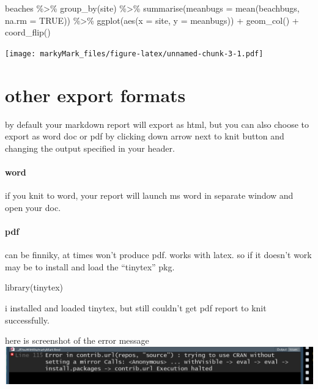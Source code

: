 \documentclass[
]{article}
\newenvironment{Shaded}{\begin{snugshade}}{\end{snugshade}}
\newcommand{\AttributeTok}[1]{\textcolor[rgb]{0.77,0.63,0.00}{#1}}
\newcommand{\ConstantTok}[1]{\textcolor[rgb]{0.00,0.00,0.00}{#1}}
\newcommand{\FunctionTok}[1]{\textcolor[rgb]{0.00,0.00,0.00}{#1}}
\newcommand{\NormalTok}[1]{#1}
\newcommand{\SpecialCharTok}[1]{\textcolor[rgb]{0.00,0.00,0.00}{#1}}
\begin{document}
\begin{Shaded}
\begin{Highlighting}[]
\NormalTok{beaches }\SpecialCharTok{\%\textgreater{}\%} 
  \FunctionTok{group\_by}\NormalTok{(site) }\SpecialCharTok{\%\textgreater{}\%} 
  \FunctionTok{summarise}\NormalTok{(}\AttributeTok{meanbugs =} \FunctionTok{mean}\NormalTok{(beachbugs, }\AttributeTok{na.rm =} \ConstantTok{TRUE}\NormalTok{)) }\SpecialCharTok{\%\textgreater{}\%} 
  \FunctionTok{ggplot}\NormalTok{(}\FunctionTok{aes}\NormalTok{(}\AttributeTok{x =}\NormalTok{ site, }\AttributeTok{y =}\NormalTok{ meanbugs)) }\SpecialCharTok{+}
  \FunctionTok{geom\_col}\NormalTok{() }\SpecialCharTok{+}
  \FunctionTok{coord\_flip}\NormalTok{()}
\end{Highlighting}
\end{Shaded}

\texttt{[image: markyMark\_files/figure-latex/unnamed-chunk-3-1.pdf]}

\hypertarget{other-export-formats}{%
\section{other export formats}\label{other-export-formats}}

by default your markdown report will export as html, but you can also
choose to export as word doc or pdf by clicking down arrow next to knit
button and changing the output specified in your header.

\hypertarget{word}{%
\paragraph{word}\label{word}}

if you knit to word, your report will launch ms word in separate window
and open your doc.

\hypertarget{pdf}{%
\paragraph{pdf}\label{pdf}}

can be finniky, at times won't produce pdf. works with latex. so if it
doesn't work may be to install and load the ``tinytex'' pkg.

\begin{Shaded}
\begin{Highlighting}[]
\FunctionTok{library}\NormalTok{(tinytex)}
\end{Highlighting}
\end{Shaded}

i installed and loaded tinytex, but still couldn't get pdf report to
knit successfully.

here is screenshot of the error message
\includegraphics{knit_pdf_error.png}
\end{document}
